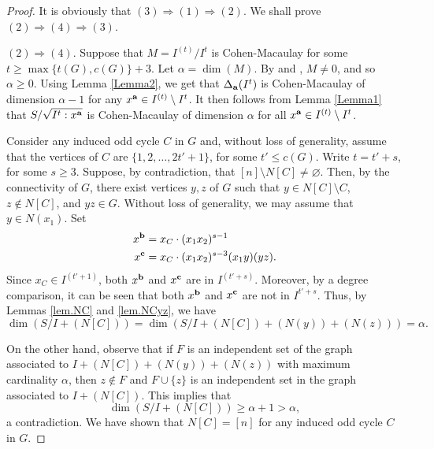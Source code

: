 \documentclass[12pt]{amsart}
\numberwithin{equation}{section}
\theoremstyle{definition}
\theoremstyle{definition}
\def\a{{\bold a}}
\def\b{{\bold b}}
\def\c{{\bold c}}
\begin{document}
\begin{proof} It is obviously that $(3) \Longrightarrow (1) \Longrightarrow (2)$. We shall prove $(2)\Longrightarrow (4) \Longrightarrow (3)$. 
	
$(2) \Longrightarrow (4)$. Suppose that $M=I^{(t)}/I^{t}$ is Cohen-Macaulay for some $t\ge \max\{t(G),c(G)\}+3$. Let $\alpha=\dim(M)$. By \cite[Theorem 4.1]{CMS2002} and \cite[Corollary 4.5]{LT2019}, $M \not= 0$, and so $\alpha \ge 0$. Using Lemma \ref{Lemma2}, we get that $\Delta_\a(I^{t})$ is Cohen-Macaulay of dimension $\alpha-1$ for any $x^\a\in I^{(t)}\setminus I^{t}$. It then follows from Lemma \ref{Lemma1} that $S/\sqrt{I^{t}: x^\a}$ is Cohen-Macaulay of dimension $\alpha$ for all $x^\a \in I^{(t)} \setminus I^{t}$.
	
Consider any induced odd cycle $C$ in $G$ and, without loss of generality, assume that the vertices of $C$ are $\{1,2,\ldots,2t'+1\}$, for some $t' \le c(G)$. Write $t = t'+s$, for some $s \ge 3$. Suppose, by contradiction, that $[n] \setminus N[C] \not= \varnothing$. Then, by the connectivity of $G$, there exist vertices $y,z$ of $G$ such that 
$y \in N[C] \setminus C$, $z \not\in N[C]$, and $yz \in G$. Without loss of generality, we may assume that $y \in N(x_1)$. Set
\begin{align*}
	x^\b & = x_C \cdot (x_1x_2)^{s-1} \\
	x^\c & = x_C \cdot (x_1x_2)^{s-3}(x_1y)(yz).
\end{align*}
Since $x_C \in I^{(t'+1)}$, both $x^\b$ and $x^\c$ are in $I^{(t'+s)}$. Moreover, by a degree comparison, it can be seen that both $x^\b$ and $x^\c$ are not in $I^{t'+s}$. Thus, by Lemmas \ref{lem.NC} and \ref{lem.NCyz}, we have
$$\dim\left(S\big/I + (N[C])\right) = \dim \left(S\big/I + (N[C]) + (N(y)) + (N(z))\right) = \alpha.$$

On the other hand, observe that if $F$ is an independent set of the graph associated to $I + (N[C]) + (N(y)) + (N(z))$ with maximum cardinality $\alpha$, then $z \not\in F$ and $F \cup \{z\}$ is an independent set in the graph associated to $I + (N[C])$. This implies that
$$\dim \left(S\big/I + (N[C])\right) \ge \alpha+1 > \alpha,$$
a contradiction. We have shown that $N[C] = [n]$ for any induced odd cycle $C$ in $G$.


\end{proof}
\end{document}

